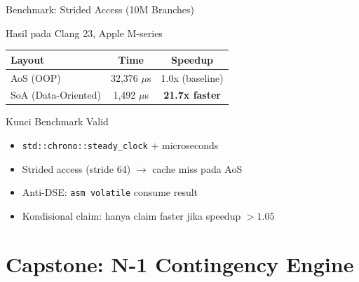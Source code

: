 \documentclass[aspectratio=169,10pt]{beamer}
\begin{document}
\begin{frame}{Benchmark: Strided Access (10M Branches)}
  \begin{block}{Hasil pada Clang 23, Apple M-series}
    \begin{center}
      \begin{tabular}{lcc}
        \toprule
        \textbf{Layout} & \textbf{Time} & \textbf{Speedup} \\
        \midrule
        AoS (OOP) & 32,376 $\mu$s & 1.0x (baseline) \\
        SoA (Data-Oriented) & 1,492 $\mu$s & \textbf{21.7x faster} \\
        \bottomrule
      \end{tabular}
    \end{center}
  \end{block}
  
  \begin{alertblock}{Kunci Benchmark Valid}
    \begin{itemize}
      \item \texttt{std::chrono::steady\_clock} + microseconds
      \item Strided access (stride 64) $\rightarrow$ cache miss pada AoS
      \item Anti-DSE: \texttt{asm volatile} consume result
      \item Kondisional claim: hanya claim faster jika speedup $> 1.05$
    \end{itemize}
  \end{alertblock}
\end{frame}

\section{Capstone: N-1 Contingency Engine}
\end{document}
